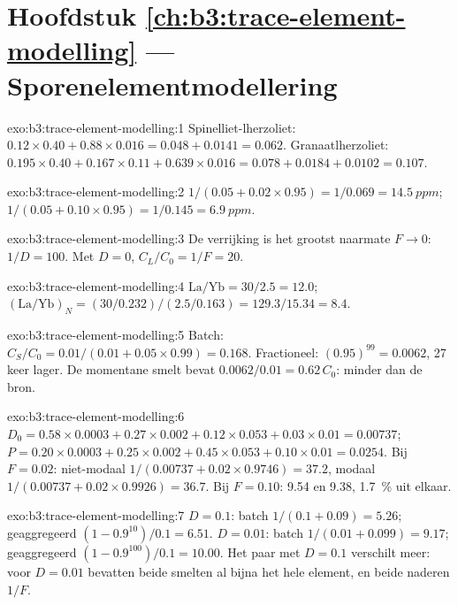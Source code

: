 \section*{Hoofdstuk \ref{ch:b3:trace-element-modelling} --- Sporenelementmodellering}

\begin{solution}{exo:b3:trace-element-modelling:1}
Spinelliet-lherzoliet: $0.12\times0.40 + 0.88\times0.016 = 0.048 + 0.0141 =
0.062$. Granaatlherzoliet: $0.195\times0.40 + 0.167\times0.11 +
0.639\times0.016 = 0.078 + 0.0184 + 0.0102 = 0.107$.
\end{solution}

\begin{solution}{exo:b3:trace-element-modelling:2}
$1/(0.05 + 0.02\times0.95) = 1/0.069 = \qty{14.5}{ppm}$;
$1/(0.05 + 0.10\times0.95) = 1/0.145 = \qty{6.9}{ppm}$.
\end{solution}

\begin{solution}{exo:b3:trace-element-modelling:3}
De verrijking is het grootst naarmate $F \to 0$: $1/D = 100$. Met $D = 0$,
$C_L/C_0 = 1/F = 20$.
\end{solution}

\begin{solution}{exo:b3:trace-element-modelling:4}
$\mathrm{La/Yb} = 30/2.5 = 12.0$; $(\mathrm{La}/\mathrm{Yb})_N =
(30/0.232)/(2.5/0.163) = 129.3/15.34 = 8.4$.
\end{solution}

\begin{solution}{exo:b3:trace-element-modelling:5}
Batch: $C_S/C_0 = 0.01/(0.01 + 0.05\times0.99) = 0.168$. Fractioneel:
$(0.95)^{99} = 0.0062$, 27 keer lager. De momentane smelt bevat
$0.0062/0.01 = 0.62\,C_0$: minder dan de bron.
\end{solution}

\begin{solution}{exo:b3:trace-element-modelling:6}
$D_0 = 0.58\times0.0003 + 0.27\times0.002 + 0.12\times0.053 + 0.03\times0.01
= 0.00737$; $P = 0.20\times0.0003 + 0.25\times0.002 + 0.45\times0.053 +
0.10\times0.01 = 0.0254$. Bij $F = 0.02$: niet-modaal $1/(0.00737 +
0.02\times0.9746) = 37.2$, modaal $1/(0.00737 + 0.02\times0.9926) = 36.7$. Bij
$F = 0.10$: 9.54 en 9.38, \qty{1.7}{\percent} uit elkaar.
\end{solution}

\begin{solution}{exo:b3:trace-element-modelling:7}
$D = 0.1$: batch $1/(0.1 + 0.09) = 5.26$; geaggregeerd $(1 - 0.9^{10})/0.1 =
6.51$. $D = 0.01$: batch $1/(0.01 + 0.099) = 9.17$; geaggregeerd
$(1 - 0.9^{100})/0.1 = 10.00$. Het paar met $D = 0.1$ verschilt meer: voor
$D = 0.01$ bevatten beide smelten al bijna het hele element, en beide naderen
$1/F$.
\end{solution}

